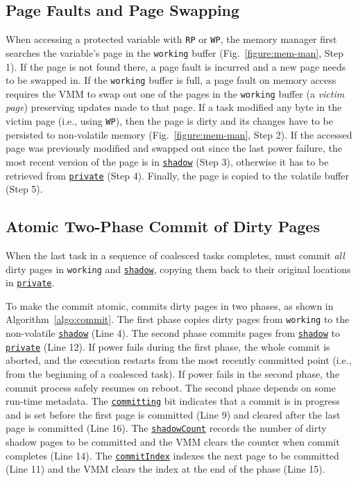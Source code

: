 \subsection{Page Faults and Page Swapping}

When accessing a protected variable with \texttt{RP} or \texttt{WP}, the memory manager first searches the variable's page in the \texttt{working} buffer (Fig.~\ref{figure:mem-man}, Step 1).
If the page is not found there, a page fault is incurred and a new page needs to be swapped in.
If the \texttt{working} buffer is full, a page fault on memory access requires the VMM to swap out one of the pages in the \texttt{working} buffer (a \emph{victim page}) preserving updates made to that page.
If a task modified any byte in the victim page (i.e., using \texttt{WP}), then the page is dirty and its changes have to be persisted to non-volatile memory (Fig.~\ref{figure:mem-man}, Step 2). If the accessed page was previously modified and swapped out since the last power failure, the most recent version of the page is in {\tt \underline{shadow}} (Step 3), otherwise it has to be retrieved from {\tt \underline{private}} (Step 4). Finally, the page is copied to the volatile buffer (Step 5).

\subsection{Atomic Two-Phase Commit of Dirty Pages}

When the last task in a sequence of coalesced tasks completes, \sys must commit \emph{all} dirty pages in \texttt{working} and \texttt{\underline{shadow}}, copying them back to their original locations in \texttt{\underline{private}}. 

To make the commit atomic, \sys commits dirty pages in two phases, as shown in Algorithm~\ref{algo:commit}. The first phase copies dirty pages from \texttt{working} to the non-volatile \texttt{\underline{shadow}} (Line 4). The second phase commits pages from \texttt{\underline{shadow}} to \texttt{\underline{private}} (Line 12).  If power fails during the first phase, the whole commit is aborted, and the execution restarts from the most recently committed point (i.e., from the beginning of a coalesced task). If power fails in the second
phase, the commit process safely resumes on reboot.  The second phase depends on some run-time metadata. The \texttt{\underline{committing}} bit indicates that a commit is in progress and is set before the first page is committed (Line 9) and cleared after the last page is committed (Line 16).  The \texttt{\underline{shadowCount}} records the number of dirty shadow pages to be committed and the VMM clears the counter when commit completes (Line 14). The \texttt{\underline{commitIndex}} indexes the next page to be committed (Line 11) and the VMM clears the index at the end of the phase (Line 15).

